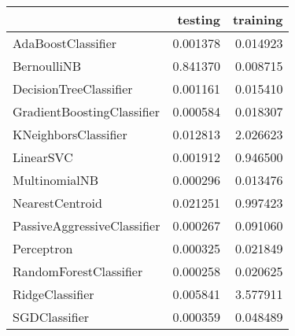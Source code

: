 \begin{tabular}{lrr}
\toprule
{} &   testing &  training \\
\midrule
AdaBoostClassifier          &  0.001378 &  0.014923 \\
BernoulliNB                 &  0.841370 &  0.008715 \\
DecisionTreeClassifier      &  0.001161 &  0.015410 \\
GradientBoostingClassifier  &  0.000584 &  0.018307 \\
KNeighborsClassifier        &  0.012813 &  2.026623 \\
LinearSVC                   &  0.001912 &  0.946500 \\
MultinomialNB               &  0.000296 &  0.013476 \\
NearestCentroid             &  0.021251 &  0.997423 \\
PassiveAggressiveClassifier &  0.000267 &  0.091060 \\
Perceptron                  &  0.000325 &  0.021849 \\
RandomForestClassifier      &  0.000258 &  0.020625 \\
RidgeClassifier             &  0.005841 &  3.577911 \\
SGDClassifier               &  0.000359 &  0.048489 \\
\bottomrule
\end{tabular}
